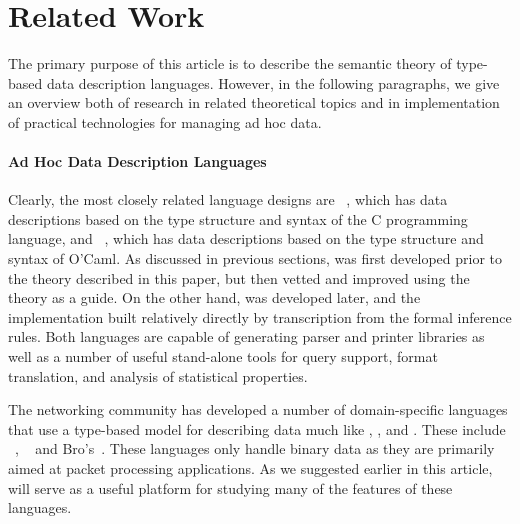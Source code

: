\section{Related Work}
\label{chap:related-work}

The primary purpose of this article is to describe the semantic theory
of type-based data description languages.  However, 
in the following paragraphs,
we give an overview both of research in related theoretical topics
and in implementation of practical technologies for
managing ad hoc data.

\paragraph*{Ad Hoc Data Description Languages}
Clearly, the most closely related language designs 
are \padsc{}~\cite{fisher+:pads},
which has data descriptions based on the 
type structure and syntax of the
C programming language,
and \padsml{}~\cite{mandelbaum+:padsml}, which has data descriptions based on
the type structure and syntax of O'Caml.  As discussed in
previous sections, \padsc{} was first developed prior to the theory
described in this paper, but then vetted and improved using the theory
as a guide.  On the other hand, \padsml{} was developed later, and
the implementation built relatively directly by transcription from the
formal inference rules.  Both languages are capable of generating
parser and printer libraries as well as a number of useful stand-alone
tools for query support, format translation, and analysis of
statistical properties.

The networking community has developed a number of domain-specific
languages that use a type-based model 
for describing data much like \padsc, \padsml, and \ddc. 
These include
\packettypes{}~\cite{sigcomm00}, \datascript{}~\cite{gpce02} and
Bro's~\cite{paxson:bro}.  These languages only handle binary
data as they are primarily aimed at packet processing applications.
As we suggested earlier in this article, \ddc{} will serve as
a useful platform for studying many of the features of these languages.

